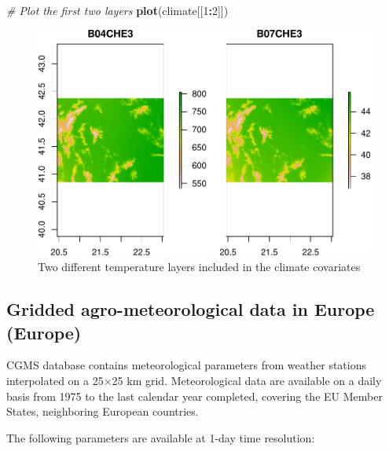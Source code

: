 \documentclass[10pt,b5paper,]{book}
\newenvironment{Shaded}{\begin{snugshade}}{\end{snugshade}}
\newcommand{\CommentTok}[1]{\textcolor[rgb]{0.56,0.35,0.01}{\textit{#1}}}
\newcommand{\DecValTok}[1]{\textcolor[rgb]{0.00,0.00,0.81}{#1}}
\newcommand{\KeywordTok}[1]{\textcolor[rgb]{0.13,0.29,0.53}{\textbf{#1}}}
\newcommand{\NormalTok}[1]{#1}
\newcommand{\OperatorTok}[1]{\textcolor[rgb]{0.81,0.36,0.00}{\textbf{#1}}}
\theoremstyle{definition}
\theoremstyle{definition}
\theoremstyle{definition}
\theoremstyle{remark}
\begin{document}
\begin{Shaded}
\begin{Highlighting}[]
\CommentTok{# Plot the first two layers}
\KeywordTok{plot}\NormalTok{(climate[[}\DecValTok{1}\OperatorTok{:}\DecValTok{2}\NormalTok{]])}
\end{Highlighting}
\end{Shaded}

\begin{figure}
\centering
\includegraphics{SOCMapping_files/figure-latex/unnamed-chunk-23-1.pdf}
\caption{\label{fig:unnamed-chunk-23}Two different temperature layers
included in the climate covariates}
\end{figure}

\hypertarget{gridded-agro-meteorological-data-in-europe-europe}{%
\subsection{Gridded agro-meteorological data in Europe
(Europe)}\label{gridded-agro-meteorological-data-in-europe-europe}}

CGMS database contains meteorological parameters from weather stations
interpolated on a 25×25 km grid. Meteorological data are available on a
daily basis from 1975 to the last calendar year completed, covering the
EU Member States, neighboring European countries.

The following parameters are available at 1-day time resolution:
\end{document}
